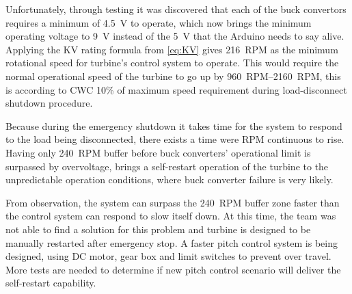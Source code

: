 \documentclass[../ewet_cwc_report.tex]{subfiles}
\begin{document}
Unfortunately, through testing it was discovered that each of
the buck convertors requires a minimum of \qty{4.5}{\V} to
operate, which now brings the minimum operating voltage to
\qty{9}{\V} instead of the \qty{5}{\V} that the Arduino needs
to say alive. Applying the KV rating formula from
\eqref{eq:KV} gives \qty{216}{RPM} as the minimum rotational
speed for turbine's control system to operate. This would
require the normal operational speed of the turbine to go up by
\qtyrange{960}{2160}{RPM}, this is according to CWC 10\% of
maximum speed requirement during load-disconnect shutdown
procedure.

Because during the emergency shutdown it takes time for the
system to respond to the load being disconnected, there exists
a time were RPM continuous to rise. Having only \qty{240}{RPM}
buffer before buck converters' operational limit is surpassed
by overvoltage, brings a self-restart operation of the turbine
to the unpredictable operation conditions, where buck converter
failure is very likely.

From observation, the system can surpass the \qty{240}{RPM}
buffer zone faster than the control system can respond to slow
itself down. At this time, the team was not able to find a
solution for this problem and turbine is designed to be
manually restarted after emergency stop. A faster pitch
control system is being designed, using DC motor, gear box and
limit switches to prevent over travel. More tests are needed
to determine if new pitch control scenario will deliver the
self-restart capability.
\end{document}
